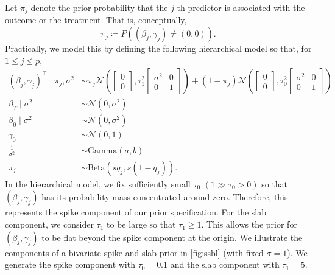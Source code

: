 \documentclass[preprint,12pt]{elsarticle}
\newcommand{\normal}{\mathcal{N}}
\begin{document}
Let $\pi_j$ denote the prior probability that the $j$-th
predictor is associated with the outcome or the 
treatment. That is, conceptually,
\begin{equation}
	\pi_j \coloneqq P\left((\beta_j,\gamma_j)\not=(0,0)\right).
\end{equation}
Practically, we model this by defining the following hierarchical model
so that,
for $1\le j\le p$,
\begin{align}
	\label{eq:spike:slab:prior:beta:gamma}(\beta_j,\gamma_j)^{\top} \mid \pi_{j}, \sigma^2 &\sim 
	\pi_{j}\normal\left( \begin{bmatrix}
		0 \\
		0
	\end{bmatrix}, 
	\tau_1^2\begin{bmatrix}
		\sigma^2 & 0 \\
		0 & 1
	\end{bmatrix}\right)
	+ (1-\pi_{j}) \normal\left(\begin{bmatrix}
		0 \\
		0
	\end{bmatrix}, 
	\tau_0^2\begin{bmatrix}
		\sigma^2 & 0 \\
		0 & 1
	\end{bmatrix}\right)\\
	\beta_T\mid \sigma^2 &\sim \normal\left(0, \sigma^2\right)\label{eq:prior:causal}\\
        \beta_0\mid \sigma^2 &\sim \normal\left(0, \sigma^2\right)\label{eq:prior:int:out}\\
        \gamma_0 &\sim \normal\left(0, 1\right)\label{eq:prior:int:trt}\\
        \frac{1}{\sigma^2}&\sim \text{Gamma}(a, b)\\
	\pi_{j} &\sim\text{Beta}\left(sq_j, s(1-q_j)\right).
\end{align}
In the hierarchical model, we fix sufficiently small $\tau_0$
$(1\gg\tau_0>0)$ so that  $(\beta_j, \gamma_j)$ has its probability mass 
concentrated around zero. Therefore, this represents the spike component of our prior specification. 
For the slab component, we consider $\tau_1$ to be large so that $\tau_1\ge 1$. This allows the prior for $(\beta_j,\gamma_j)$ to be flat beyond the spike component at the origin. 
We illustrate the components of a bivariate spike and slab prior in 
\cref{fig:ssbl} (with fixed $\sigma=1$). We generate the spike component 
with $\tau_0=0.1$ and the slab component with $\tau_1=5$.
\end{document}
